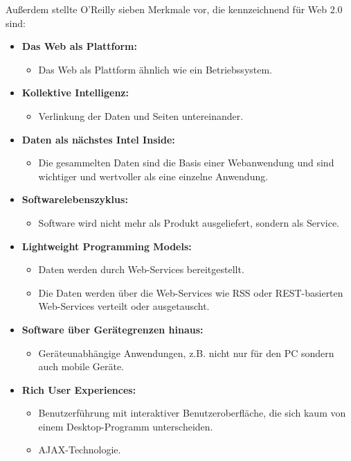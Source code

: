 Außerdem stellte O’Reilly sieben Merkmale vor, die kennzeichnend für Web 2.0 sind:

\begin{itemize}
\item \textbf{Das Web als Plattform:}
\begin{itemize}
\item Das Web als Plattform ähnlich wie ein Betriebssystem.
\end{itemize}
\item \textbf{Kollektive Intelligenz:}
\begin{itemize}
\item Verlinkung der Daten und Seiten untereinander.
\end{itemize}
\item \textbf{Daten als nächstes Intel Inside:}
\begin{itemize}
\item Die gesammelten Daten sind die Basis einer Webanwendung und sind wichtiger und wertvoller als eine einzelne Anwendung.
\end{itemize}
\item \textbf{Softwarelebenszyklus:}
\begin{itemize}
\item Software wird nicht mehr als Produkt ausgeliefert, sondern als Service.
\end{itemize}
\item \textbf{Lightweight Programming Models:}
\begin{itemize}
\item Daten werden durch Web-Services bereitgestellt.
\end{itemize}
\begin{itemize}
\item Die Daten werden über die Web-Services wie RSS oder REST-basierten Web-Services verteilt oder ausgetauscht.
\end{itemize}
\item \textbf{Software über Gerätegrenzen hinaus:}
\begin{itemize}
\item Geräteunabhängige Anwendungen, z.B. nicht nur für den PC sondern auch mobile Geräte.
\end{itemize}
\item \textbf{Rich User Experiences:}
\begin{itemize}
\item Benutzerführung mit interaktiver Benutzeroberfläche, die sich kaum von einem Desktop-Programm unterscheiden.
\end{itemize}
\begin{itemize}
\item AJAX-Technologie.
\end{itemize}
\end{itemize}

